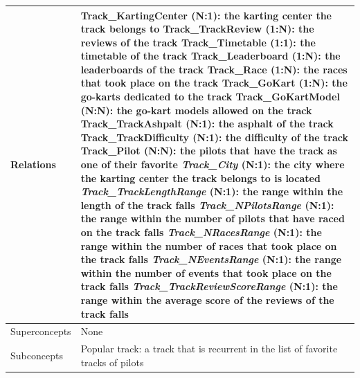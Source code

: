 \documentclass{beamer}
\begin{document}
\begin{frame}
\begin{table}
\tiny
\begin{tabular}{|p{2cm}|p{6cm}|}
\hline
Relations &
Track\_KartingCenter (N:1): the karting center the track belongs to \newline
Track\_TrackReview (1:N): the reviews of the track \newline
Track\_Timetable (1:1): the timetable of the track \newline
Track\_Leaderboard (1:N): the leaderboards of the track \newline
Track\_Race (1:N): the races that took place on the track \newline
Track\_GoKart (1:N): the go-karts dedicated to the track \newline
Track\_GoKartModel (N:N): the go-kart models allowed on the track \newline
Track\_TrackAshpalt (N:1): the asphalt of the track \newline
Track\_TrackDifficulty (N:1): the difficulty of the track \newline
Track\_Pilot (N:N): the pilots that have the track as one of their favorite \newline
\textit{Track\_City} (N:1): the city where the karting center the track belongs to is located \newline
\textit{Track\_TrackLengthRange} (N:1): the range within the length of the track falls \newline
\textit{Track\_NPilotsRange} (N:1): the range within the number of pilots that have raced on the track falls \newline
\textit{Track\_NRacesRange} (N:1): the range within the number of races that took place on the track falls \newline
\textit{Track\_NEventsRange} (N:1): the range within the number of events that took place on the track falls \newline
\textit{Track\_TrackReviewScoreRange} (N:1): the range within the average score of the reviews of the track falls \\
\hline
Superconcepts & None \\
\hline
Subconcepts & 
Popular track: a track that is recurrent in the list of favorite tracks of pilots \\
\hline
\end{tabular}
\end{table}
\end{frame}
\end{document}
